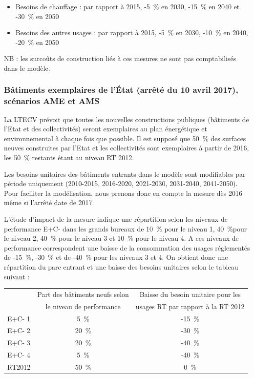 \documentclass[10.5pt,a4paper]{article}
\begin{document}
{\begin{itemize}
	\item Besoins de chauffage : par rapport à 2015, -5~\% en 2030, -15~\% en 2040 et  -30~\% en 2050 
	\item Besoins des autres usages : par rapport à 2015,  -5~\% en 2030, -10~\% en 2040, -20~\% en 2050
\end{itemize}

NB : les surcoûts de construction liés à ces mesures ne sont pas comptabilisés dans le modèle.

\subsubsection{Bâtiments exemplaires de l’État (arrêté du 10 avril 2017), scénarios AME et AMS }

La LTECV prévoit que toutes les nouvelles constructions publiques (bâtiments de l’Etat et des collectivités) seront exemplaires au plan énergétique et environnemental à chaque fois que possible. Il est supposé que 50~\% des surfaces neuves construites par l’Etat et les collectivités sont exemplaires à partir de 2016, les 50~\% restants étant au niveau RT 2012. 

Les besoins unitaires des bâtiments entrants dans le modèle sont modifiables par période uniquement (2010-2015, 2016-2020, 2021-2030, 2031-2040, 2041-2050). Pour faciliter la modélisation, nous prenons donc en compte la mesure dès 2016 même si l’arrêté date de 2017. 

L’étude d’impact de la mesure indique une répartition selon les niveaux de performance E+C- dans les grands bureaux de 10~\% pour le niveau 1, 40~\%pour le niveau 2, 40~\% pour le niveau 3 et 10~\% pour le niveau 4. A ces niveaux de performance correspondent une baisse de la consommation des usages réglementés de -15~\%, -30~\% et de -40~\% pour les niveaux 3 et 4. On obtient donc une répartition du parc entrant et une baisse des besoins unitaires selon le tableau suivant : 

\begin{table}[h!]
\begin{center}
\begin{tabular}{|l|c|c|}
\hline
				&	Part des bâtiments neufs selon  & Baisse du besoin unitaire pour les \\
				& le niveau de performance				& usages RT par rapport à la RT 2012 \\
				\hline
				
E+C- 1	& 5~\% 	& -15~\% \\ 
E+C- 2	& 20~\% 	& -30~\% \\
E+C- 3	& 20~\% 	& -40~\% \\
E+C- 4	& 5~\% 	& -40~\% \\
RT2012	& 50~\% 	& 0~\% \\
\hline
\end{tabular}
\end{center}
\end{table}

}
\end{document}
